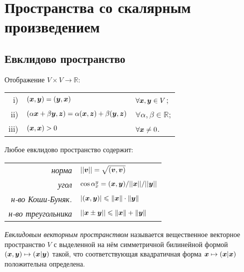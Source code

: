 \section{Пространства со скалярным произведением}

\subsection{Евклидово пространство}

\begin{minipage}[t]{0.4\textwidth}
    \begin{to_def}
    Отображение $V \times V \to \mathbb{R}$:\\
        \begin{tabular}{r|ll}
            i) & $(\mbox{\boldmath $x$}, \mbox{\boldmath $y$}) = (\mbox{\boldmath $y$}, \mbox{\boldmath $x$})$ & $\forall \mbox{\boldmath $x$}, \mbox{\boldmath $y$} \in V$; \\
            ii) & $(\alpha \mbox{\boldmath $x$} + \beta \mbox{\boldmath $y$}, \mbox{\boldmath $z$}) = \alpha (\mbox{\boldmath $x$}, \mbox{\boldmath $z$}) + \beta (\mbox{\boldmath $y$}, \mbox{\boldmath $z$})$ & $\forall \alpha, \beta \in \mathbb{R}$; \\
            iii) & $(\mbox{\boldmath $x$}, \mbox{\boldmath $x$}) > 0$ & $\forall \mbox{\boldmath $x$} \neq 0$. \\
        \end{tabular}
    \end{to_def}
\end{minipage}
\hfill
\begin{minipage}[t]{0.45\textwidth}
    \noindent
    Любое евклидово пространство содержит:\\
    \begin{tabular}{rl}
        \textit{норма }              & $||\mbox{\boldmath $v$}|| = \sqrt{(\mbox{\boldmath $v$}, \mbox{\boldmath $v$})}$ \\
        \textit{угол }               & $\cos \alpha_{{x}}^{{y}} = (\mbox{\boldmath $x$}, \mbox{\boldmath $y$}) / ||\mbox{\boldmath $x$}|| / ||\mbox{\boldmath $y$}||$ \\
        \textit{н-во Коши-Буняк.}    & $|(\mbox{\boldmath $x$}, \mbox{\boldmath $y$})| \leqslant \|\mbox{\boldmath $x$}\| \cdot \|\mbox{\boldmath $y$}\|$\\
        \textit{н-во треугольника}   & $||{\mbox{\boldmath $x$} \pm \mbox{\boldmath $y$}}|| \leqslant \|\mbox{\boldmath $x$}\| + \|\mbox{\boldmath $y$}\|$\\
    \end{tabular}
\end{minipage}


\begin{to_def} 
  \textit{Евклидовым векторным пространством} называется вещественное векторное пространство $V$ с выделенной на нём симметричной билинейной формой $(\mbox{\boldmath $x$}, \mbox{\boldmath $y$}) \mapsto (\mbox{\boldmath $x$} | \mbox{\boldmath $y$})$ такой, что соответствующая квадратичная форма $\mbox{\boldmath $x$} \mapsto (\mbox{\boldmath $x$} | \mbox{\boldmath $x$})$  положительна определена.
\end{to_def}

